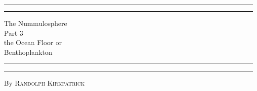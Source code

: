\documentclass[a4paper, 12pt, oneside, landscape]{article}
\begin{document}
\begin{titlepage} %
	\centering %
	\scshape %

	
	\rule{\textwidth}{1.6pt}\vspace*{-\baselineskip}\vspace*{2pt} %
	\rule{\textwidth}{0.4pt} %
	
	\vspace{0.25\baselineskip} %
	
	{\LARGE The Nummulosphere\\ Part 3\\ the Ocean Floor or\\ Benthoplankton\\} %
	
	\vspace{0.25\baselineskip} %
	
	\rule{\textwidth}{0.4pt}\vspace*{-\baselineskip}\vspace{3.2pt} %
	\rule{\textwidth}{1.6pt} %
	
	\vspace{0.5\baselineskip} %
	
	
	{By \scshape\Large Randolph Kirkpatrick\\} %
	
	\vspace*{0.1\baselineskip} %
	
	
	\vspace{0.1\baselineskip} %

	
	

\end{titlepage}
\end{document}
